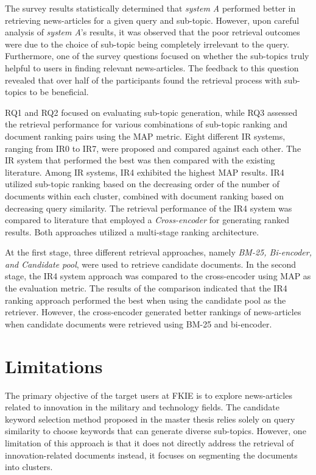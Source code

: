 The survey results statistically determined that \emph{system A} performed better in retrieving news-articles for a given query and sub-topic. However, upon careful analysis of \emph{system A}'s results, it was observed that the poor retrieval outcomes were due to the choice of sub-topic being completely irrelevant to the query. Furthermore, one of the survey questions focused on whether the sub-topics truly helpful to users in finding relevant news-articles. The feedback to this question revealed that over half of the participants found the retrieval process with sub-topics to be beneficial.

RQ1 and RQ2 focused on evaluating sub-topic generation, while RQ3 assessed the retrieval performance for various combinations of sub-topic ranking and document ranking pairs using the \ac{MAP} metric. Eight different \ac{IR} systems, ranging from IR0 to IR7, were proposed and compared against each other. The \ac{IR} system that performed the best was then compared with the existing literature. Among IR systems, IR4 exhibited the highest \ac{MAP} results. IR4 utilized sub-topic ranking based on the decreasing order of the number of documents within each cluster, combined with document ranking based on decreasing query similarity. The retrieval performance of the IR4 system was compared to literature that employed a \emph{Cross-encoder} for generating ranked results. Both approaches utilized a multi-stage ranking architecture.

At the first stage, three different retrieval approaches, namely \emph{BM-25, Bi-encoder, and Candidate pool}, were used to retrieve candidate documents. In the second stage, the IR4 system approach was compared to the cross-encoder using \ac{MAP} as the evaluation metric. The results of the comparison indicated that the IR4 ranking approach performed the best when using the candidate pool as the retriever. However, the cross-encoder generated better rankings of news-articles when candidate documents were retrieved using BM-25 and bi-encoder.

\section{Limitations}

The primary objective of the target users at \ac{FKIE} is to explore news-articles related to innovation in the military and technology fields. The candidate keyword selection method proposed in the master thesis relies solely on query similarity to choose keywords that can generate diverse sub-topics. However, one limitation of this approach is that it does not directly address the retrieval of innovation-related documents instead, it focuses on segmenting the documents into clusters.

